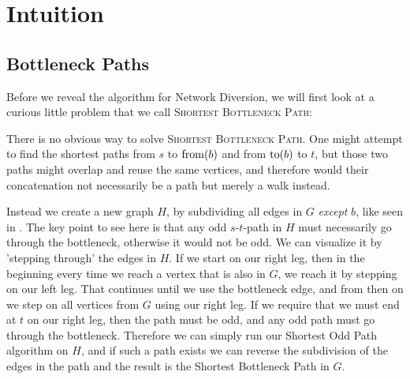 \section{Intuition}
\subsection{Bottleneck Paths}
\label{section:subdividing-bottlenecks}
Before we reveal the algorithm for Network Diversion, we will first look at a curious little problem that we call \textsc{Shortest Bottleneck Path}:

\noindent{}

There is no obvious way to solve \textsc{Shortest Bottleneck Path}. One might attempt to find the shortest paths from $s$ to $\operatorname{from}(b)$ and from $\operatorname{to}(b)$ to $t$, but those two paths might overlap and reuse the same vertices, and therefore would their concatenation not necessarily be a path but merely a walk instead.

Instead we create a new graph $H$, by subdividing all edges in $G$ \emph{except} $b$, like seen in . The key point to see here is that any odd $s$-$t$-path in $H$ must necessarily go through the bottleneck, otherwise it would not be odd. We can visualize it by 'stepping through' the edges in $H$. If we start on our right leg, then in the beginning every time we reach a vertex that is also in $G$, we reach it by stepping on our left leg. That continues until we use the bottleneck edge, and from then on we step on all vertices from $G$ using our right leg. If we require that we must end at $t$ on our right leg, then the path must be odd, and any odd path must go through the bottleneck. Therefore we can simply run our Shortest Odd Path algorithm on $H$, and if such a path exists we can reverse the subdivision of the edges in the path and the result is the Shortest Bottleneck Path in $G$.

